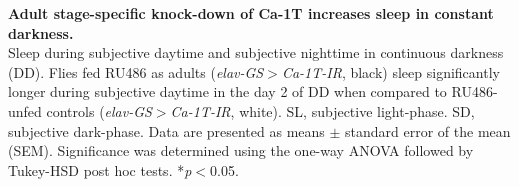 \label{fig:S5}
\textbf{Adult stage-specific knock-down of Ca-\alpha1T increases sleep in constant darkness.}
\\
Sleep during subjective daytime and subjective nighttime in continuous darkness (DD). 
Flies fed RU486 as adults (\emph{elav-GS$>$Ca-\alpha1T-IR}, black) sleep significantly longer during subjective daytime in the day 2 of DD when compared to RU486-unfed controls (\emph{elav-GS$>$Ca-\alpha1T-IR}, white).
SL, subjective light-phase.
SD, subjective dark-phase.
Data are presented as means $\pm$ standard error of the mean (SEM).
Significance was determined using the one-way ANOVA followed by Tukey-HSD post hoc tests.
*\emph{p}$<$0.05.
